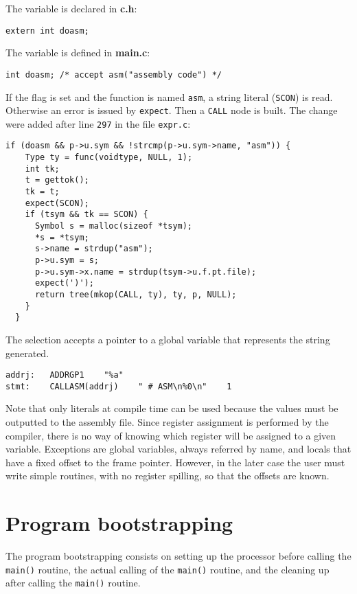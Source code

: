 The variable is declared in {\bf c.h}:
\begin{Verbatim}[baselinestretch=1.2]
extern int doasm;
\end{Verbatim}

The variable is defined in {\bf main.c}:
\begin{Verbatim}[baselinestretch=1.2]
int doasm; /* accept asm("assembly code") */
\end{Verbatim}

If the flag is set and the function is named
{\tt asm}, a string literal ({\tt SCON}) is read.
Otherwise an error is issued by {\tt expect}.
Then a {\tt CALL} node is built.
The change were added after line {\tt 297} in the file
{\tt expr.c}:
\begin{Verbatim}[baselinestretch=1.2]
  if (doasm && p->u.sym && !strcmp(p->u.sym->name, "asm")) {
    Type ty = func(voidtype, NULL, 1);
    int tk;
    t = gettok();
    tk = t;
    expect(SCON);
    if (tsym && tk == SCON) {
      Symbol s = malloc(sizeof *tsym);
      *s = *tsym;
      s->name = strdup("asm");
      p->u.sym = s;
      p->u.sym->x.name = strdup(tsym->u.f.pt.file);
      expect(')');
      return tree(mkop(CALL, ty), ty, p, NULL);
    }
  }
\end{Verbatim}

The selection accepts a pointer to a global
variable that represents the string generated.
\begin{Verbatim}[baselinestretch=1.2]
addrj:   ADDRGP1    "%a"
stmt:    CALLASM(addrj)    " # ASM\n%0\n"    1
\end{Verbatim}

Note that only literals at compile time can be used
because the values must be outputted to the assembly file.
Since register assignment is performed by the compiler,
there is no way of knowing which register will be
assigned to a given variable.
Exceptions are global variables, always referred by name,
and locals that have a fixed offset to the frame pointer.
However, in the later case the user must write simple
routines, with no register spilling, so that the offsets
are known.

\section{Program bootstrapping}\label{boot}

The program bootstrapping consists on setting up the
processor before calling the {\tt main()} routine, the
actual calling of the {\tt main()} routine, and the
cleaning up after calling the {\tt main()} routine.

